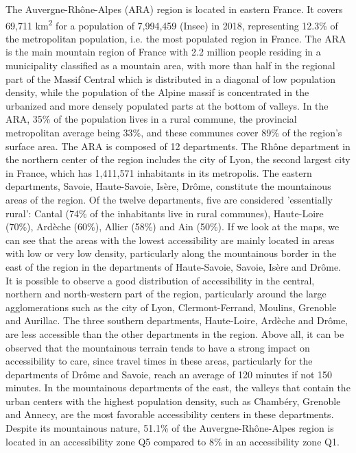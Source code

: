 The Auvergne-Rhône-Alpes (ARA) region is located in eastern France. It covers 69,711 km\textsuperscript{2} for a population of 7,994,459 (Insee) in 2018, representing 12.3\% of the metropolitan population, i.e. the most populated region in France. The ARA is the main mountain region of France with 2.2 million people residing in a municipality classified as a mountain area, with more than half in the regional part of the Massif Central which is distributed in a diagonal of low population density, while the population of the Alpine massif is concentrated in the urbanized and more densely populated parts at the bottom of valleys. In the ARA, 35\% of the population lives in a rural commune, the provincial metropolitan average being 33\%, and these communes cover 89\% of the region's surface area. The ARA is composed of 12 departments. The Rhône department in the northern center of the region includes the city of Lyon, the second largest city in France, which has 1,411,571 inhabitants in its metropolis. The eastern departments, Savoie, Haute-Savoie, Isère, Drôme, constitute the mountainous areas of the region. Of the twelve departments, five are considered 'essentially rural': Cantal (74\% of the inhabitants live in rural communes), Haute-Loire (70\%), Ardèche (60\%), Allier (58\%) and Ain (50\%). If we look at the maps, we can see that the areas with the lowest accessibility are mainly located in areas with low or very low density, particularly along the mountainous border in the east of the region in the departments of Haute-Savoie, Savoie, Isère and Drôme. It is possible to observe a good distribution of accessibility in the central, northern and north-western part of the region, particularly around the large agglomerations such as the city of Lyon, Clermont-Ferrand, Moulins, Grenoble and Aurillac. The three southern departments, Haute-Loire, Ardèche and Drôme, are less accessible than the other departments in the region. Above all, it can be observed that the mountainous terrain tends to have a strong impact on accessibility to care, since travel times in these areas, particularly for the departments of Drôme and Savoie, reach an average of 120 minutes if not 150 minutes. In the mountainous departments of the east, the valleys that contain the urban centers with the highest population density, such as Chambéry, Grenoble and Annecy, are the most favorable accessibility centers in these departments. Despite its mountainous nature, 51.1\% of the Auvergne-Rhône-Alpes region is located in an accessibility zone Q5 compared to 8\% in an accessibility zone Q1.

